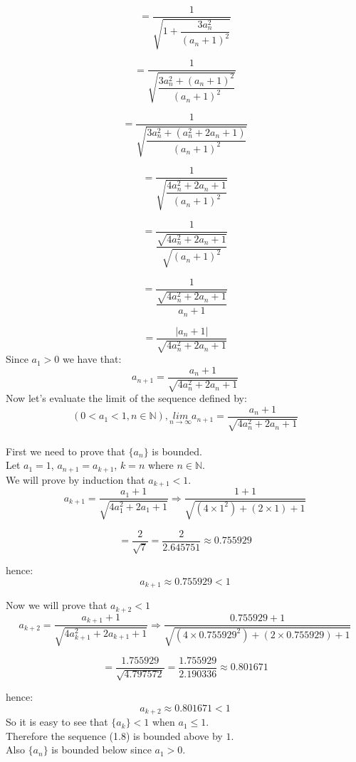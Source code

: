 \documentclass[12pt, letterpaper, oneside]{report}
\begin{document}
\[
=\dfrac{1}{\sqrt{1+\dfrac{3a_{n}^{2}}{(a_{n}+1)^{2}}}}
\]

\[
=\dfrac{1}{\sqrt{ \dfrac{ 3 a_{ n }^{2}+( a_{ n }+1 )^{2} }{ ( a_{n}+1 )^{2} } } }
\]

\[ =\dfrac{1}{ \sqrt{ \dfrac{ 3a_{ n }^{ 2 }+( a_{ n }^2 + 2 a_{ n }+1 ) }{ ( a_{ n }+1 )^{ 2 } } } }
\]

\[
=\dfrac{ 1 }{\sqrt{\dfrac{4a_{n}^{2}+2a_{n}+1}{(a_{n}+1)^{2}}}}
\]

\[
=\dfrac{1}{\dfrac{ \sqrt{4a_{n}^{2}+2a_{n}+1} }{ \sqrt{(a_{n}+1)^{2}} } }
\]

\[
=\dfrac{ 1 }{ \dfrac{ \sqrt{ 4 a_{ n }^{ 2 } + 2 a_{ n } + 1 } }{ a_{ n } + 1 } }
\]

\[
=\dfrac{ | a_{n}+1 | }{ \sqrt{ 4 a_{ n }^{ 2 } + 2 a_{ n }+1} }
\]
Since ${ a_1 > 0 }$ we have that:
\[
a_{ n + 1 }=\dfrac{ a_{ n } + 1 }{ \sqrt{ 4 a_{ n }^{ 2 } + 2 a_{ n } + 1} }
\]
Now let's evaluate the limit of the sequence defined by: 
\begin{equation}\label{lim-def1}
(0 < a_{ 1 } < 1, n \in \mathbb N),
\underset{ n \to \infty }{lim} a_{ n+1 }=\dfrac{ a_{ n } + 1 }{ \sqrt{4 a_{ n }^{2} + 2 a_{n} + 1 } }
\end{equation}
\\
First we need to prove that $\{a_{n}\}$ is bounded. 
\\
Let $ a_{ 1 } = 1 $, $ a_{ n + 1 } = a_{k+1}$, $ k = n $ where $n \in \mathbb N$.
\\
We will prove by induction that $ a_{k + 1} < 1$.
\[
a_{k+1} =\dfrac{ a_{ 1 } + 1 }{ \sqrt{4 a_{ 1 }^{2} + 2 a_{1} + 1 } } \Rightarrow \dfrac{ 1 + 1 }{\sqrt{(4\times 1^{2})+(2\times 1)+1}}
\]

\[
= \dfrac{ 2 }{  \sqrt{ 7 } } = \dfrac{2}{2.645751} \approx 0.755929
\]

hence:
\[
a_{k+1} \approx 0.755929 < 1 
\]

Now we will prove that $ a_{ k + 2 } < 1 $
\[
a_{k + 2}=\dfrac{ a_{ k+1 } + 1 }{ \sqrt{ 4 a_{ k+1 }^{ 2 } + 2 a_{ k+1 } + 1} } \Rightarrow \dfrac{ 0.755929 + 1 }{  \sqrt{ (4\times 0.755929^{2} ) + ( 2\times 0.755929 ) + 1 } }
\]

\[
= \dfrac{ 1.755929 }{  \sqrt{4.797572}} = \dfrac{1.755929}{2.190336} \approx 0.801671 
\]

hence: \[ a_{k+2} \approx 0.801671 < 1 \]
So it is easy to see that $\{a_{k}\} < 1$ when $ a_{1} \le 1$.
\\
Therefore the sequence (1.8) is bounded above by $1$.
\\
Also ${\{a_{n}\}}$ is bounded below since $a_{1} > 0 $.
\end{document}
